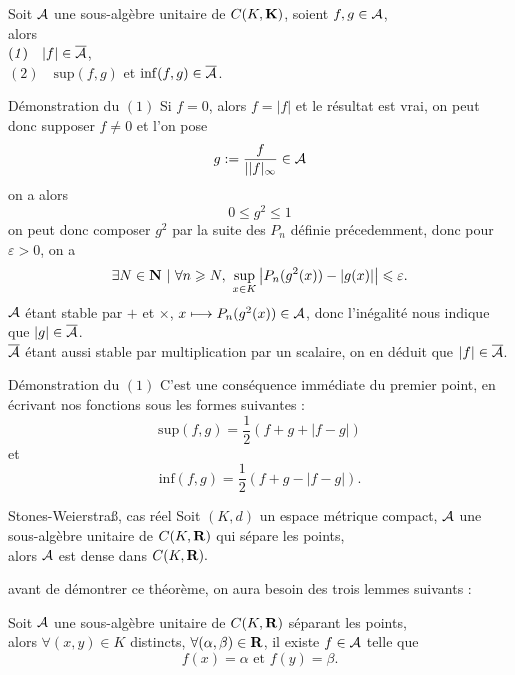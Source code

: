 \documentclass[a4paper,11pt, twoside]{article}
\begin{document}
\begin{prop}
  Soit $\mathcal A$ une sous-algèbre unitaire de $C(K,\mathbf K)$, soient $f,g\in\mathcal A$,\\
  
  alors\\
  $(\mathit 1)\quad |f|\in\overline{\mathcal A}$,\\[1em]
  $(\mathit 2)\quad \mathrm{sup}(f,g)$ et $\mathrm{inf}(f,g)\in\overline{\mathcal A}$.
\end{prop}


\begin{ProofC}{Démonstration du $(\mathit1)$}
  Si $f=0$, alors $f=|f|$ et le résultat est vrai, on peut donc supposer $f\neq 0$ et l'on pose 
  $$g:=\frac{f}{||f|_{\infty}}\in\mathcal A$$
  on a alors 
  $$0\leqslant g^2\leqslant 1$$
  on peut donc composer $g^2$ par la suite des $P_n$ définie précedemment, donc pour $\varepsilon>0$, on a 
  $$\exists N\in\mathbf N\ |\ \forall n\geqslant N,\ \underset{x\in K}{\mathrm{sup}}\left|P_n(g^2(x))-|g(x)|\right|\leqslant\varepsilon.$$
  $\mathcal A$ étant stable par $+$ et $\times$, $x\longmapsto P_n(g^2(x))\in\mathcal A$, donc l'inégalité nous indique que $|g|\in\overline{\mathcal A}$.\\
  $\overline{\mathcal A}$ étant aussi stable par multiplication par un scalaire, on en déduit que $|f|\in\overline{\mathcal A}$.
\end{ProofC}


\begin{ProofC}{Démonstration du $(\mathit1)$}
  C'est une conséquence immédiate du premier point, en écrivant nos fonctions sous les formes suivantes : 
  $$\mathrm{sup}(f,g)=\frac12\left(f+g+|f-g|\right)$$
  et
  $$\mathrm{inf}(f,g)=\frac12\left(f+g-|f-g|\right).$$
\end{ProofC}


\begin{thC}{Stones-Weierstra\ss, cas réel}
  Soit $(K,d)$ un espace métrique compact, $\mathcal A$ une sous-algèbre unitaire de $C(K,\mathbf R)$ qui sépare les points,\\
  alors $\mathcal A$ est dense dans $C(K,\mathbf R).$
\end{thC}


avant de démontrer ce théorème, on aura besoin des trois lemmes suivants :


\begin{lemme}
  Soit $\mathcal A$ une sous-algèbre unitaire de $C(K,\mathbf R)$ séparant les points,\\

  alors $\forall (x,y)\in K$ distincts, $\forall (\alpha,\beta)\in\mathbf R$, il existe $f\in\mathcal A$ telle que 
  $$f(x)=\alpha\text{ et }f(y)=\beta.$$
\end{lemme}
\end{document}

